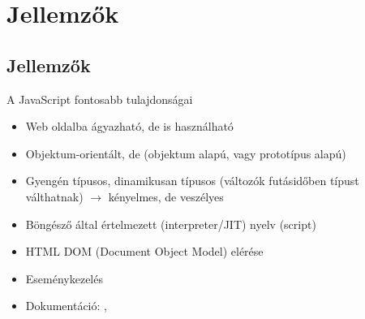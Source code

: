 \section{Jellemzők}

\subsection{Jellemzők}

\begin{frame}
    A JavaScript fontosabb tulajdonságai
    \begin{itemize}
      \item Web oldalba ágyazható, de  is használható
      \item Objektum-orientált, de  (objektum alapú,
  vagy prototípus alapú)
      \item Gyengén típusos, dinamikusan típusos (változók futásidőben típust
  válthatnak) $\rightarrow$ kényelmes, de veszélyes
      \item Böngésző által értelmezett (interpreter/JIT) nyelv (script)
      \item HTML DOM (Document Object Model) elérése
      \item Eseménykezelés
      \item Dokumentáció:
  , 
    \end{itemize}
  \end{frame}